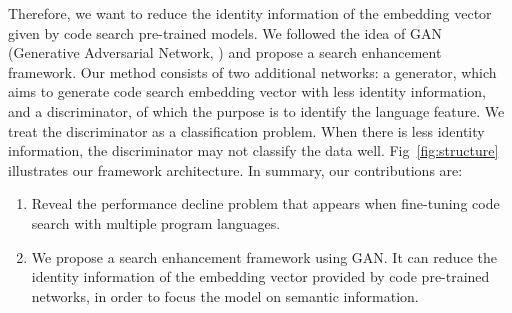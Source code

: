 
Therefore, we want to reduce the identity information of the embedding vector given by code search pre-trained models. We followed the idea of GAN (Generative Adversarial Network, \citealp{goodfellow2020generative}) and propose a search enhancement framework. Our method consists of two additional networks: a generator, which aims to generate code search embedding vector with less identity information, and a discriminator, of which the purpose is to identify the language feature. We treat the discriminator as a classification problem. When there is less identity information, the discriminator may not classify the data well. Fig~\ref{fig:structure} illustrates our framework architecture.
In summary, our contributions are:
\begin{enumerate} 
\item Reveal the performance decline problem that appears when fine-tuning code search with multiple program languages.
\item We propose a search enhancement framework using GAN. It can reduce the identity information of the embedding vector provided by code pre-trained networks, in order to focus the model on semantic information.
\end{enumerate} 


\begin{table}[htbp]
	\centering
	\caption{Performance comparisons with different fine-tuning program languages}
	\vspace{-5pt}
	\label{tab:comparison}%
	\vspace{-10	pt}
\end{table}%
